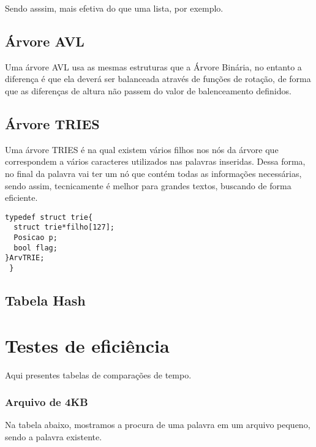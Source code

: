 \documentclass[
	12pt,				%
    oneside,			%
	a4paper,			%
	english,			%
	french,				%
	spanish,			%
	brazil,				%
	]{abntex2}
\begin{document}
Sendo asssim, mais efetiva do que uma lista, por exemplo.


\section{Árvore AVL}

Uma árvore AVL usa as mesmas estruturas que a Árvore Binária, no entanto a diferença é que ela deverá ser balanceada através de funções de rotação, de forma que as diferenças de altura não passem do valor de balenceamento definidos.


\section{Árvore TRIES}
 Uma árvore TRIES é na qual existem vários filhos nos nós da árvore que correspondem a vários caracteres utilizados nas palavras inseridas. Dessa forma, no final da palavra vai ter um nó que contém todas as informações necessárias, sendo assim, tecnicamente é melhor para grandes textos, buscando de forma eficiente.


  \begin{lstlisting}
typedef struct trie{
  struct trie*filho[127];
  Posicao p;
  bool flag;
}ArvTRIE;
 } \end{lstlisting}


\section{Tabela Hash}

\chapter {Testes de eficiência}
Aqui presentes tabelas de comparações de tempo.

\subsection{Arquivo de 4KB}

Na tabela abaixo, mostramos a procura de uma palavra em um arquivo pequeno, sendo a palavra existente.
\end{document}
